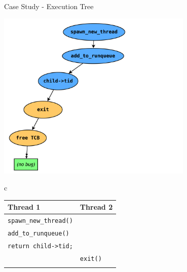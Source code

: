 \documentclass[xcolor=dvipsnames]{beamer}
\begin{document}

\begin{frame}{Case Study - Execution Tree}
	\begin{center}
		\includegraphics[width=0.7\textwidth]{threadfork0.pdf}
		\hspace{-0.5in} {\tiny 
		\begin{tabular}{c}
			\begin{tabular}{|l|l|}
				\hline
				\cellcolor{thread1} {\bf Thread 1} & \cellcolor{thread2} {\bf Thread 2} \\
				\hline
				{\tt spawn\_new\_thread()} & \\
				\hline
				{\tt add\_to\_runqueue()} & \\
				\hline
				{\tt return child->tid;} & \\
				\hline
				& {\tt exit()} \\
				\hline
				& {\tt <free TCB>} \\
				\hline
			\end{tabular}
			\\ \\ \\ \\ \\ \\ \\ \\
			\\ \\ \\ \\ \\ \\ \\ \\
			\\ \\ \\ \\ \\ \\ \\ \\

\end{tabular}}
\end{center}
\end{frame}
\end{document}
